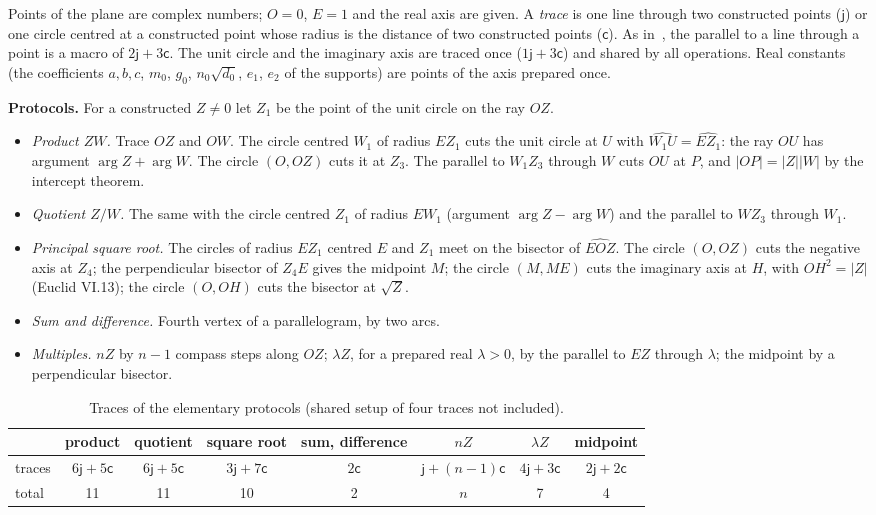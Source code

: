 \documentclass[10pt,a4paper]{article}
\theoremstyle{plain}
\theoremstyle{remark}
\numberwithin{equation}{section}
\begin{document}
Points of the plane are complex numbers; $O=0$, $E=1$ and the real axis are given. A \emph{trace}
is one line through two constructed points ($\mathsf j$) or one circle centred at a constructed
point whose radius is the distance of two constructed points ($\mathsf c$). As in~\cite{v28}, the
parallel to a line through a point is a macro of $2\mathsf j+3\mathsf c$. The unit circle and the
imaginary axis are traced once ($1\mathsf j+3\mathsf c$) and shared by all operations. Real
constants (the coefficients $a,b,c$, $m_0$, $g_0$, $n_0\sqrt{d_0}$, $e_1$, $e_2$ of the supports)
are points of the axis prepared once.

\textbf{Protocols.} For a constructed $Z\neq0$ let $Z_1$ be the point of the unit circle on the ray
$OZ$.
\begin{itemize}
\item \emph{Product $ZW$.} Trace $OZ$ and $OW$. The circle centred $W_1$ of radius $EZ_1$ cuts the
  unit circle at $U$ with $\widehat{W_1U}=\widehat{EZ_1}$: the ray $OU$ has argument
  $\arg Z+\arg W$. The circle $(O,OZ)$ cuts it at $Z_3$. The parallel to $W_1Z_3$ through $W$ cuts
  $OU$ at $P$, and $|OP|=|Z||W|$ by the intercept theorem.
\item \emph{Quotient $Z/W$.} The same with the circle centred $Z_1$ of radius $EW_1$ (argument
  $\arg Z-\arg W$) and the parallel to $WZ_3$ through $W_1$.
\item \emph{Principal square root.} The circles of radius $EZ_1$ centred $E$ and $Z_1$ meet on the
  bisector of $\widehat{EOZ}$. The circle $(O,OZ)$ cuts the negative axis at $Z_4$; the
  perpendicular bisector of $Z_4E$ gives the midpoint $M$; the circle $(M,ME)$ cuts the imaginary
  axis at $H$, with $OH^{2}=|Z|$ (Euclid VI.13); the circle $(O,OH)$ cuts the bisector at $\sqrt Z$.
\item \emph{Sum and difference.} Fourth vertex of a parallelogram, by two arcs.
\item \emph{Multiples.} $nZ$ by $n-1$ compass steps along $OZ$; $\lambda Z$, for a prepared real
  $\lambda>0$, by the parallel to $EZ$ through $\lambda$; the midpoint by a perpendicular bisector.
\end{itemize}

\begin{table}[h]
\centering\small
\begin{tabular}{@{}lccccccc@{}}
\toprule
 & product & quotient & square root & sum, difference & $nZ$ & $\lambda Z$ & midpoint\\
\midrule
traces & $6\mathsf j+5\mathsf c$ & $6\mathsf j+5\mathsf c$ & $3\mathsf j+7\mathsf c$ & $2\mathsf c$
 & $\mathsf j+(n-1)\mathsf c$ & $4\mathsf j+3\mathsf c$ & $2\mathsf j+2\mathsf c$\\
total & 11 & 11 & 10 & 2 & $n$ & 7 & 4\\
\bottomrule
\end{tabular}
\caption{Traces of the elementary protocols (shared setup of four traces not included).}
\label{tab:ops}
\end{table}
\end{document}
